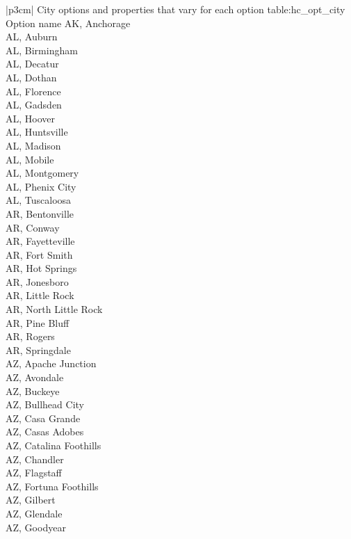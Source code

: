 \begin{customLongTable}{ |p{3cm}| }
{City options and properties that vary for each option} {table:hc_opt_city}
{Option name}
AK, Anchorage \\ \hline
AL, Auburn \\ \hline
AL, Birmingham \\ \hline
AL, Decatur \\ \hline
AL, Dothan \\ \hline
AL, Florence \\ \hline
AL, Gadsden \\ \hline
AL, Hoover \\ \hline
AL, Huntsville \\ \hline
AL, Madison \\ \hline
AL, Mobile \\ \hline
AL, Montgomery \\ \hline
AL, Phenix City \\ \hline
AL, Tuscaloosa \\ \hline
AR, Bentonville \\ \hline
AR, Conway \\ \hline
AR, Fayetteville \\ \hline
AR, Fort Smith \\ \hline
AR, Hot Springs \\ \hline
AR, Jonesboro \\ \hline
AR, Little Rock \\ \hline
AR, North Little Rock \\ \hline
AR, Pine Bluff \\ \hline
AR, Rogers \\ \hline
AR, Springdale \\ \hline
AZ, Apache Junction \\ \hline
AZ, Avondale \\ \hline
AZ, Buckeye \\ \hline
AZ, Bullhead City \\ \hline
AZ, Casa Grande \\ \hline
AZ, Casas Adobes \\ \hline
AZ, Catalina Foothills \\ \hline
AZ, Chandler \\ \hline
AZ, Flagstaff \\ \hline
AZ, Fortuna Foothills \\ \hline
AZ, Gilbert \\ \hline
AZ, Glendale \\ \hline
AZ, Goodyear \\ \hline

\end{customLongTable}
